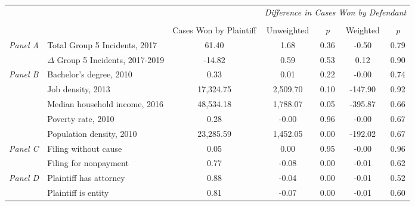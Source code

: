 \begin{tabular}{llccccc}
\toprule
 &  & \textit{} & \multicolumn{4}{c}{\textit{Difference in Cases Won by Defendant}} \\
\cline{4-7}
\\
 &  & Cases Won by Plaintiff & Unweighted & \emph{p} & Weighted & \emph{p} \\
\midrule
\multirow[c]{2}{3cm}{\textit{Panel A}} & Total Group 5 Incidents, 2017 & 61.40 & 1.68 & 0.36 & -0.50 & 0.79 \\
 & $\Delta$ Group 5 Incidents, 2017-2019 & -14.82 & 0.59 & 0.53 & 0.12 & 0.90 \\
\cline{1-7}
\multirow[c]{5}{3cm}{\textit{Panel B}} & Bachelor's degree, 2010 & 0.33 & 0.01 & 0.22 & -0.00 & 0.74 \\
 & Job density, 2013 & 17,324.75 & 2,509.70 & 0.10 & -147.90 & 0.92 \\
 & Median household income, 2016 & 48,534.18 & 1,788.07 & 0.05 & -395.87 & 0.66 \\
 & Poverty rate, 2010 & 0.28 & -0.00 & 0.96 & -0.00 & 0.67 \\
 & Population density, 2010 & 23,285.59 & 1,452.05 & 0.00 & -192.02 & 0.67 \\
\cline{1-7}
\multirow[c]{2}{3cm}{\textit{Panel C}} & Filing without cause & 0.05 & 0.00 & 0.95 & -0.00 & 0.96 \\
 & Filing for nonpayment & 0.77 & -0.08 & 0.00 & -0.01 & 0.62 \\
\cline{1-7}
\multirow[c]{2}{3cm}{\textit{Panel D}} & Plaintiff has attorney & 0.88 & -0.04 & 0.00 & -0.01 & 0.52 \\
 & Plaintiff is entity & 0.81 & -0.07 & 0.00 & -0.01 & 0.60 \\
\cline{1-7}
\bottomrule
\end{tabular}
